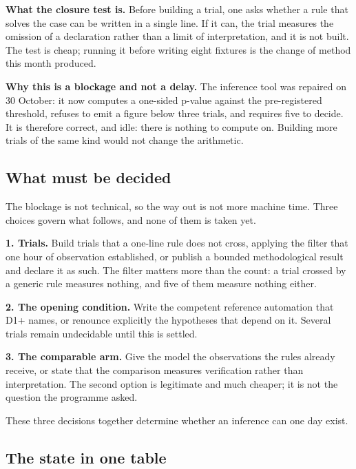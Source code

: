 \textbf{What the closure test is.} Before building a trial, one asks whether a rule
that solves the case can be written in a single line. If it can, the trial measures
the omission of a declaration rather than a limit of interpretation, and it is not
built. The test is cheap; running it before writing eight fixtures is the change of
method this month produced.

\textbf{Why this is a blockage and not a delay.} The inference tool was repaired on
30 October: it now computes a one-sided p-value against the pre-registered
threshold, refuses to emit a figure below three trials, and requires five to
decide. It is therefore correct, and idle: there is nothing to compute on. Building
more trials of the same kind would not change the arithmetic.

\subsection{What must be decided}
\label{sec:decisions}

The blockage is not technical, so the way out is not more machine time. Three
choices govern what follows, and none of them is taken yet.

\textbf{1. Trials.} Build trials that a one-line rule does not cross, applying
the filter that one hour of observation established, or publish a bounded
methodological result and declare it as such. The filter matters more than the
count: a trial crossed by a generic rule measures nothing, and five of them
measure nothing either.

\textbf{2. The opening condition.} Write the competent reference automation that
D1+ names, or renounce explicitly the hypotheses that depend on it. Several
trials remain undecidable until this is settled.

\textbf{3. The comparable arm.} Give the model the observations the rules already
receive, or state that the comparison measures verification rather than
interpretation. The second option is legitimate and much cheaper; it is not the
question the programme asked.

These three decisions together determine whether an inference can one day exist.

\subsection{The state in one table}
\label{sec:table-etat}

